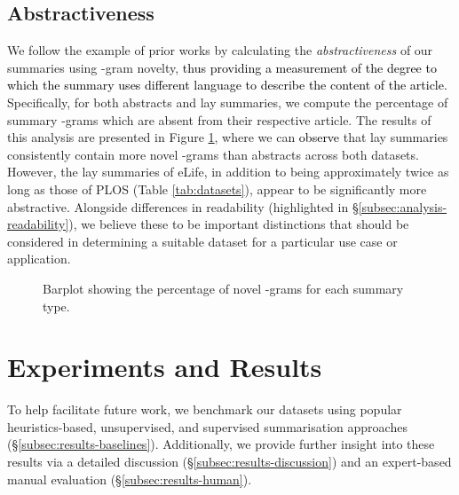 \documentclass[11pt]{article}
\begin{document}
\subsection{Abstractiveness}  \label{subsec:analysis-abstractiveness}
We follow the example of prior works \citep{Sharma2019-ue, See2017-ve} by calculating the \textit{abstractiveness} of our summaries using -gram novelty,
\textcolor{black}{thus providing a measurement of the degree to which the summary uses different language to describe the content of the article.}
Specifically, for both abstracts and lay summaries, we compute the percentage of summary -grams which are absent from their respective article. The results of this analysis are presented in Figure \ref{fig:novel_ngrams}, where we can \textcolor{black}{observe} that lay summaries consistently contain more novel -grams than abstracts across both datasets. However, the lay summaries of eLife, in addition to being approximately twice as long as those of PLOS (Table \ref{tab:datasets}), appear to be significantly more abstractive. 
Alongside differences in readability (highlighted in \S\ref{subsec:analysis-readability}), we believe these to be important distinctions that should be considered in determining a suitable dataset for a particular use case or application.

\begin{figure}[t]
    \centering
    \caption{Barplot showing the percentage of novel -grams for each summary type.}
    \label{fig:novel_ngrams}
\end{figure}


 \section{Experiments and Results} \label{sec:exp}

To help facilitate future work, we benchmark our datasets using popular heuristics-based, unsupervised, and supervised summarisation approaches  (\S\ref{subsec:results-baselines}). Additionally, we provide further insight into these results via a detailed discussion (\S\ref{subsec:results-discussion}) and an expert-based manual evaluation (\S\ref{subsec:results-human}).   
\end{document}
